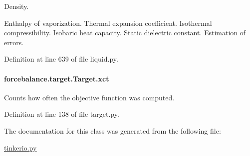 Density. 

Enthalpy of vaporization. Thermal expansion coefficient. Isothermal compressibility. Isobaric heat capacity. Static dielectric constant. Estimation of errors. 

Definition at line 639 of file liquid.\-py.

\hypertarget{classforcebalance_1_1target_1_1Target_aad2e385cfbf7b4a68f1c2cb41133fe82}{
\paragraph[{xct}]{\setlength{\rightskip}{0pt plus 5cm}forcebalance.\-target.\-Target.\-xct\hspace{0.3cm}{\ttfamily [inherited]}}}\label{classforcebalance_1_1target_1_1Target_aad2e385cfbf7b4a68f1c2cb41133fe82}


Counts how often the objective function was computed. 



Definition at line 138 of file target.\-py.



The documentation for this class was generated from the following file\-:\begin{DoxyCompactItemize}
\item 
\hyperlink{tinkerio_8py}{tinkerio.\-py}\end{DoxyCompactItemize}
